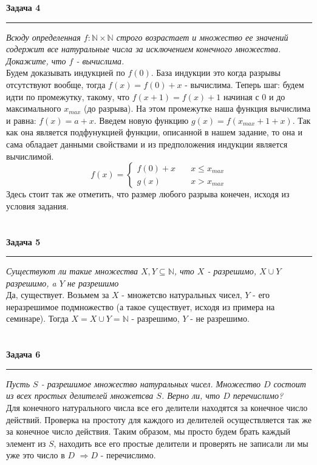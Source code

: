 \documentclass[a4paper,11pt]{article}
\begin{document}
\textbf{\large Задача 4}
\medskip\hrule\medskip
\textit{Всюду определенная $ f : \mathbb{N} \times \mathbb{N}$ строго возрастает и множество ее значений содержит все натуральные числа за исключением конечного множества. Докажите, что $  f $ - вычислима.} \\

Будем доказывать индукцией по $ f(0) $.  База индукции это когда разрывы отсутствуют вообще, тогда  $ f(x) = f(0) + x $ - вычислима. Теперь шаг: будем идти по промежутку, такому, что $ f(x + 1) = f(x) + 1 $ начиная с $ 0 $ и до максимального $ x_{max} $ (до разрыва). На этом промежутке наша функция вычислима и равна: $ f(x) = a + x $. Введем новую функцию $ g(x) = f(x_{max} + 1 + x) $. Так как она является подфунукцией функции, описанной в нашем задание, то она и сама обладает данными свойствами и из предположения индукции является вычислимой. \\
\[
	f(x) = 
	\begin{cases}
		f(0) + x \quad &x \leq x_{max} \\
		g(x) \quad &x > x_{max} 	
	\end{cases}
\]
Здесь стоит так же отметить, что размер любого разрыва конечен, исходя из условия задания.
\\ \\ \\


\textbf{\large Задача 5}
\medskip\hrule\medskip
\textit{Существуют ли такие множества $ X, Y \subseteq \mathbb{N}$, что $ X $ - разрешимо, $ X \cup Y $ разрешимо, a $ Y $ не разрешимо } \\ 

Да, существует. Возьмем за $ X $ -  множетсво натуральных чисел, $ Y $ - его неразрешимое подмножество (а такое существует, исходя из примера на семинаре). Тогда $ X = X \cup Y = \mathbb{N} $ -  разрешимо, $ Y $ - не разрешимо.
\\ \\ \\



\textbf{\large Задача 6}
\medskip\hrule\medskip
\textit{Пусть $ S $ - разрешимое множество натуральных чисел. Множество $  D $ состоит из всех простых делителей множетсва $ S $. Верно ли, что $ D $ перечислимо?}  \\

Для конечного натурального числа все его делители находятся за конечное число действий. Проверка на простоту для каждого из делителей осуществляется так же за конечное число действия. Таким образом, мы просто будем брать каждый элемент из $ S $, находить все его простые делители и проверять не записали ли мы уже это число в $ D $ $ \Rightarrow D $ - перечислимо.
\\ \\ \\
\end{document}
